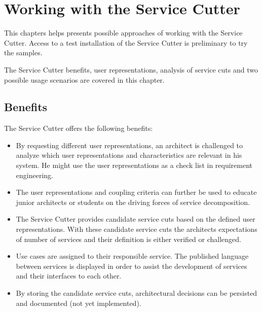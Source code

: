 \chapter{Working with the Service Cutter} 

This chapters helps presents possible approaches of working with the Service Cutter. Access to a test installation of the Service Cutter is preliminary to try the samples.

The Service Cutter benefits, user representations, analysis of service cuts and two possible usage scenarios are covered in this chapter.

\section{Benefits}

The Service Cutter offers the following benefits:

\begin{itemize}
	\item By requesting different user representations, an architect is challenged to analyze which user representations and characteristics are relevant in his system. He might use the user representations as a check list in requirement engineering.
	\item The user representations and coupling criteria can further be used to educate junior architects or students on the driving forces of service decomposition.
	\item The Service Cutter provides candidate service cuts based on the defined user representations. With these candidate service cuts the architects expectations of number of services and their definition is either verified or challenged. 
	\item Use cases are assigned to their responsible service. The published language between services is displayed in order to assist the development of services and their interfaces to each other.
	\item By storing the candidate service cuts, architectural decisions can be persisted and documented (not yet implemented).
	
	
\end{itemize}






